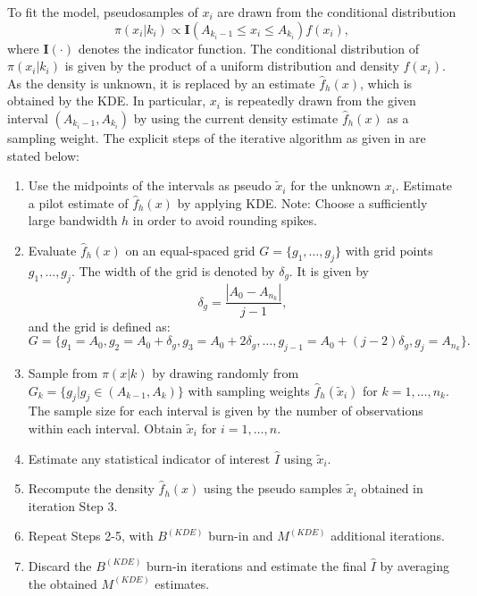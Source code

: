 To fit the model, pseudosamples of \(x_{i}\) are drawn from the conditional distribution
\begin{equation*}
\pi\left(x_{i}|k_{i}\right) \propto \textbf{I}\left(A_{k_{i}-1} \leq x_{i} \leq A_{k_{i}}\right) f\left(x_{i}\right),
\end{equation*}
where \(\textbf{I}\left(\cdot\right)\) denotes the indicator function. The conditional distribution of \(\pi\left(x_{i}|k_{i}\right)\) is given by the product of a uniform distribution and density \(f\left(x_{i}\right)\). As the density is unknown, it is replaced by an estimate \(\hat{f}_{h}\left(x\right)\), which is obtained by the KDE. In particular, \(x_{i}\) is repeatedly drawn from the given interval \(\left(A_{k_{i}-1}, A_{k_{i}}\right)\) by using the current density estimate \(\hat{f}_{h}\left(x\right)\) as a sampling weight. The explicit steps of the iterative algorithm as given in \citet{Wal19} are stated below:
\begin{enumerate}
\item Use the midpoints of the intervals as pseudo \(\tilde{x}_{i}\) for the unknown \(x_{i}\). Estimate a pilot estimate of \(\hat{f}_{h}\left(x\right)\) by applying KDE. Note: Choose a sufficiently large bandwidth \(h\) in order to avoid rounding spikes.
\item Evaluate \(\hat{f}_{h}\left(x\right)\) on an equal-spaced grid \(G=\{g_{1}, \ldots , g_{j}\}\) with  grid points \(g_{1}, \ldots ,g_{j}\). The width of the grid is denoted by \(\delta _{g}\). It is given by
\begin{equation*}
\delta _{g} = \frac{|A_{0}-A_{n_{k}}|}{j-1},
\end{equation*}
and the grid is defined as:
\begin{equation*}
G=\{g_{1}=A_{0}, g_{2}=A_{0}+\delta _{g},g_{3}= A_{0}+2\delta _{g}, \ldots , g_{j-1}=A_{0}+\left(j-2\right)\delta _{g}, g_{j}=A_{n_{k}} \}.
\end{equation*}


\item Sample from \(\pi\left(x|k\right)\) by drawing randomly from \(G_k=\{g_j| g_j\in \left(A_{k-1},A_k\right)\} \) with sampling weights \(\hat{f}_{h}\left(\tilde{x}_{i}\right)\) for \(k=1, \ldots ,n_{k}\). The sample size for each interval is given by the number of observations within each interval. Obtain \(\tilde{x}_{i}\) for \(i=1,\ldots ,n\).
\item Estimate any statistical indicator of interest \(\hat{I}\) using \(\tilde{x}_{i}\).
\item Recompute the density \(\hat{f}_{h}\left(x\right)\) using the pseudo samples \(\tilde{x}_{i}\) obtained in iteration Step 3.
\item Repeat Steps 2-5, with \(B^{(KDE)}\) burn-in and \(M^{(KDE)}\) additional iterations.
\item Discard the \(B^{(KDE)}\) burn-in iterations and estimate the final \(\hat{I}\) by averaging the obtained \(M^{(KDE)}\) estimates.

\end{enumerate}
